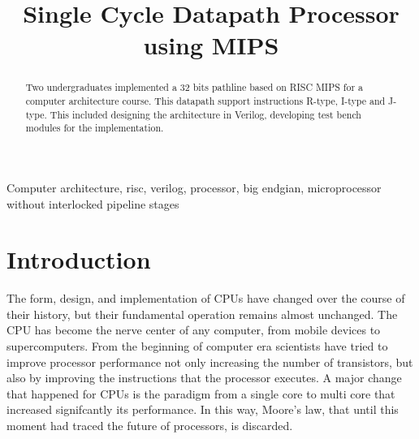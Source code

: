 \documentclass[conference]{IEEEtran}
\begin{document}
\title{Single Cycle Datapath Processor using MIPS\\
}

\author{
\and
{}
}

\maketitle

\begin{abstract}
Two undergraduates implemented a 32 bits pathline based on RISC MIPS for a computer architecture course. This datapath support instructions R-type, I-type and J-type. This included designing the architecture in Verilog, developing test bench modules for the implementation.
\end{abstract}

\begin{IEEEkeywords}
Computer architecture, risc, verilog, processor, big endgian, microprocessor without interlocked pipeline stages
\end{IEEEkeywords}

\section{Introduction}	%
The form, design, and implementation of CPUs have changed over the course of their history, but their
fundamental operation remains almost unchanged. The CPU has become the nerve center of any computer,
from mobile devices to supercomputers. From the beginning	of computer era scientists have tried to improve
processor performance not only increasing the number of transistors, but also by improving the instructions
that the processor executes. A major change that happened for CPUs is the paradigm from a single core to multi core that increased signifcantly its performance. In this way, Moore's law, that until this moment had traced the future of processors,
is discarded.
\end{document}
